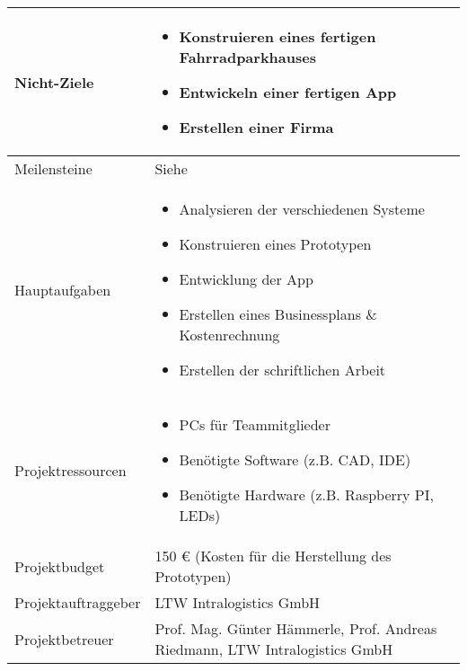 \begin{longtable}{p{}|p{}}
  Nicht-Ziele           &
  \begin{itemize}
    \item Konstruieren eines fertigen Fahrradparkhauses
    \item Entwickeln einer fertigen App
    \item Erstellen einer Firma
  \end{itemize}                                                                     \\
  \hline

  Meilensteine          & Siehe \nameref{tab:meilensteine}                                                               \\
  \hline

  Hauptaufgaben         &
  \begin{itemize}
    \item Analysieren der verschiedenen Systeme
    \item Konstruieren eines Prototypen
    \item Entwicklung der App
    \item Erstellen eines Businessplans \& Kostenrechnung
    \item Erstellen der schriftlichen Arbeit
  \end{itemize}                                                                   \\
  \hline

  Projektressourcen     &
  \begin{itemize}
    \item PCs für Teammitglieder
    \item Benötigte Software (z.B. \ac{CAD}, \ac{IDE})
    \item Benötigte Hardware (z.B. Raspberry PI, LEDs)
  \end{itemize}                                                                      \\
  \hline

  Projektbudget         & 150 \euro{} (Kosten für die Herstellung des Prototypen)                                        \\
  \hline

  Projektauftraggeber   & LTW Intralogistics GmbH                                                                        \\
  \hline

  Projektbetreuer       & Prof. Mag. Günter Hämmerle, Prof. Andreas Riedmann, LTW Intralogistics GmbH                    \\
  \hline


\end{longtable}
